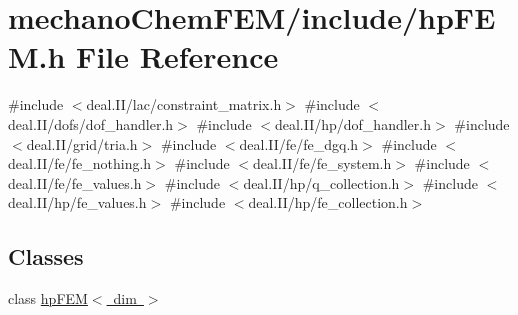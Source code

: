 \section{mechano\+Chem\+F\+E\+M/include/hp\+F\+EM.h File Reference}
\label{hp_f_e_m_8h}
{\ttfamily \#include $<$deal.\+I\+I/lac/constraint\+\_\+matrix.\+h$>$}\newline
{\ttfamily \#include $<$deal.\+I\+I/dofs/dof\+\_\+handler.\+h$>$}\newline
{\ttfamily \#include $<$deal.\+I\+I/hp/dof\+\_\+handler.\+h$>$}\newline
{\ttfamily \#include $<$deal.\+I\+I/grid/tria.\+h$>$}\newline
{\ttfamily \#include $<$deal.\+I\+I/fe/fe\+\_\+dgq.\+h$>$}\newline
{\ttfamily \#include $<$deal.\+I\+I/fe/fe\+\_\+nothing.\+h$>$}\newline
{\ttfamily \#include $<$deal.\+I\+I/fe/fe\+\_\+system.\+h$>$}\newline
{\ttfamily \#include $<$deal.\+I\+I/fe/fe\+\_\+values.\+h$>$}\newline
{\ttfamily \#include $<$deal.\+I\+I/hp/q\+\_\+collection.\+h$>$}\newline
{\ttfamily \#include $<$deal.\+I\+I/hp/fe\+\_\+values.\+h$>$}\newline
{\ttfamily \#include $<$deal.\+I\+I/hp/fe\+\_\+collection.\+h$>$}\newline
\subsection*{Classes}
\begin{DoxyCompactItemize}
\item 
class \mbox{\hyperlink{classhp_f_e_m}{hp\+F\+E\+M$<$ dim $>$}}
\end{DoxyCompactItemize}

